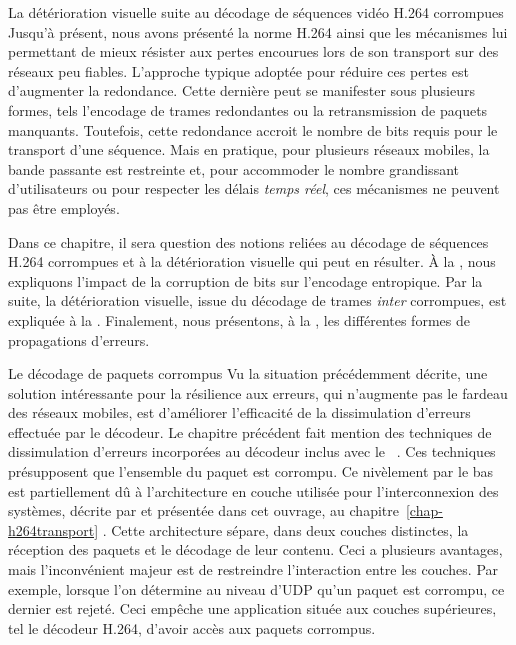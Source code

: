 \begin{chapter}{La détérioration visuelle suite au décodage de séquences vidéo H.264 corrompues}
\label{chap-erreur}
Jusqu'à présent, nous avons présenté la norme H.264 ainsi que les mécanismes lui
permettant de mieux résister aux pertes encourues lors de son transport sur des
réseaux peu fiables. L'approche typique adoptée pour réduire ces pertes est
d'augmenter la redondance. Cette dernière peut se manifester sous plusieurs
formes, tels l'encodage de trames redondantes ou la retransmission de paquets
manquants. Toutefois, cette redondance accroit le nombre de bits requis pour le
transport d'une séquence. Mais en pratique, pour plusieurs réseaux mobiles, la
bande passante est restreinte et, pour accommoder le nombre grandissant
d'utilisateurs ou pour respecter les délais \textit{temps réel}, ces mécanismes
ne peuvent pas être employés.

Dans ce chapitre, il sera question des notions reliées au décodage de séquences
H.264 corrompues et à la détérioration visuelle qui peut en résulter. À la
, nous expliquons l'impact de la corruption de bits sur
l'encodage entropique. Par la suite, la détérioration visuelle, issue du
décodage de trames \textit{inter} corrompues, est expliquée à la
. Finalement, nous présentons, à la
, les différentes formes de propagations d'erreurs.

\begin{section}{Le décodage de paquets corrompus}
\label{sect-decode}
Vu la situation précédemment décrite, une solution intéressante pour la
résilience aux erreurs, qui n'augmente pas le fardeau des réseaux mobiles, est
d'améliorer l'efficacité de la dissimulation d'erreurs effectuée par le
décodeur. Le chapitre précédent fait mention des techniques de dissimulation
d'erreurs incorporées au décodeur inclus avec le
\ltCodec~. Ces techniques présupposent que l'ensemble
du paquet est corrompu. Ce nivèlement par le bas est partiellement dû à
l'architecture en couche utilisée pour l'interconnexion des systèmes, décrite
par \citet{Zimmermann1980} et présentée dans cet ouvrage, au
chapitre~\ref{chap-h264transport} . Cette architecture sépare,
dans deux couches distinctes, la réception des paquets et le décodage de leur
contenu. Ceci a plusieurs avantages, mais l'inconvénient majeur est de
restreindre l'interaction entre les couches. Par exemple, lorsque l'on détermine
au niveau d'UDP qu'un paquet est corrompu, ce dernier est rejeté. Ceci empêche
une application située aux couches supérieures, tel le décodeur H.264, d'avoir
accès aux paquets corrompus.


\end{section}
\end{chapter}
